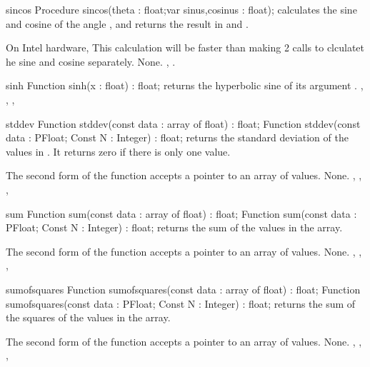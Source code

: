 

\begin{procedure}{sincos}
\Declaration
Procedure sincos(theta : float;var sinus,cosinus : float);
\Description
{} calculates the sine and cosine of the angle ,
and returns the result in  and .

On Intel hardware, This calculation will be faster than making 2 calls
to clculatet he sine and cosine separately.
\Errors
None.
\SeeAlso
{}, .
\end{procedure}



\begin{function}{sinh}
\Declaration
Function sinh(x : float) : float;
\Description
{} returns the hyperbolic sine of its argument .
\Errors
\SeeAlso
{}, , , 
\end{function}



\begin{function}{stddev}
\Declaration
Function stddev(const data : array of float) : float;
Function stddev(const data : PFloat; Const N : Integer) : float;
\Description
{} returns the standard deviation of the values in .
It returns zero if there is only one value.

The second form of the function accepts a pointer to an array of 
values.
\Errors
None.
\SeeAlso
{}, , , 
\end{function}



\begin{function}{sum}
\Declaration
Function sum(const data : array of float) : float;
Function sum(const data : PFloat; Const N : Integer) : float;
\Description
{} returns the sum of the values in the  array.

The second form of the function accepts a pointer to an array of 
values.
\Errors
None.
\SeeAlso
{}, , 
, 
\end{function}



\begin{function}{sumofsquares}
\Declaration
Function sumofsquares(const data : array of float) : float;
Function sumofsquares(const data : PFloat; Const N : Integer) : float;
\Description
{} returns the sum of the squares of the values in the  
array.

The second form of the function accepts a pointer to an array of 
values.
\Errors
None.
\SeeAlso
{}, , 
, 
\end{function}

